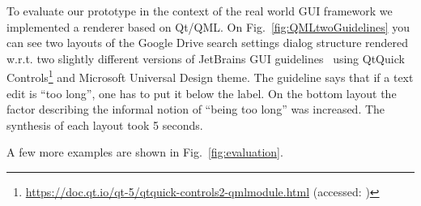 


To evaluate our prototype in the context of the real world GUI framework we implemented a renderer based on Qt/QML.
On Fig.~\ref{fig:QMLtwoGuidelines} you can see two layouts of the
Google Drive search settings dialog structure rendered  w.r.t. two slightly different versions of JetBrains GUI guidelines~\cite{JBG} using QtQuick Controls\footnote{\url{https://doc.qt.io/qt-5/qtquick-controls2-qmlmodule.html}  (accessed: )} and Microsoft Universal Design theme.
The guideline says that if a text edit is ``too long'', one has to put it below the label.
On the bottom layout the factor describing the informal notion of ``being too long'' was increased.
The synthesis of each layout took 5 seconds.

A few more examples are shown in Fig.~\ref{fig:evaluation}.



